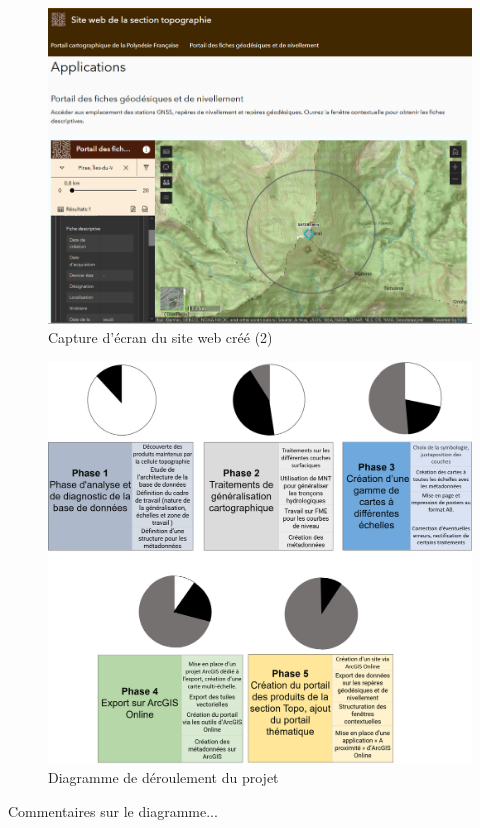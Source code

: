 \documentclass{themeensg}
\begin{document}
\begin{appendices}
\begin{figure}[!h]
\centering
\includegraphics[width=\linewidth]{images/Annexes/siteweb2.png}
\caption{Capture d'écran du site web créé (2) }
\label{site2}
\end{figure}
\label{annexepj}


\label{gantt}

\begin{figure}[!h]
\centering
\includegraphics[width=\linewidth]{images/Annexes/gantt.png}%
\caption{Diagramme de déroulement du projet}
\label{gantt}
\end{figure}


Commentaires sur le diagramme...

\clearpage




\end{appendices} 
\end{document}
